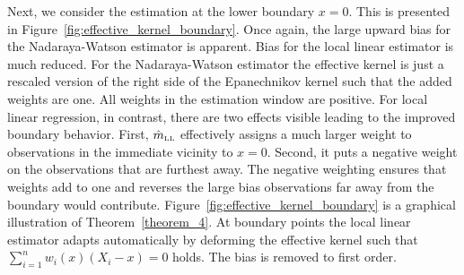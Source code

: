 Next, we consider the estimation at the lower boundary $x = 0$.
This is presented in Figure~\ref{fig:effective_kernel_boundary}.
Once again, the large upward bias for the Nadaraya-Watson estimator is apparent.
Bias for the local linear estimator is much reduced.
For the Nadaraya-Watson estimator the effective kernel is just a rescaled version of the right side of the Epanechnikov kernel such that the added weights are one.
All weights in the estimation window are positive.
For local linear regression, in contrast, there are two effects visible leading to the improved boundary behavior.
First, $\hat{m}_{\textup{\tiny LL}}$ effectively assigns a much larger weight to observations in the immediate vicinity to $x = 0$.
Second, it puts a negative weight on the observations that are furthest away.
The negative weighting ensures that weights add to one and reverses the large bias observations far away from the boundary would contribute.
Figure~\ref{fig:effective_kernel_boundary} is a graphical illustration of Theorem~\ref{theorem_4}.
At boundary points the local linear estimator adapts automatically by deforming the effective kernel such that $\sum_{i = 1}^{n} w_i(x) (X_i - x) = 0$ holds.
The bias is removed to first order.